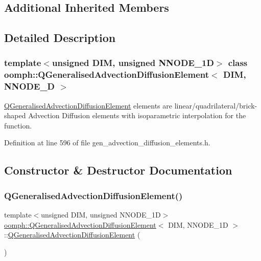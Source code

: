 \subsection*{Additional Inherited Members}


\subsection{Detailed Description}
\subsubsection*{template$<$unsigned D\+IM, unsigned N\+N\+O\+D\+E\+\_\+1D$>$\newline
class oomph\+::\+Q\+Generalised\+Advection\+Diffusion\+Element$<$ D\+I\+M, N\+N\+O\+D\+E\+\_\+D $>$}

\hyperlink{classoomph_1_1QGeneralisedAdvectionDiffusionElement}{Q\+Generalised\+Advection\+Diffusion\+Element} elements are linear/quadrilateral/brick-\/shaped Advection Diffusion elements with isoparametric interpolation for the function. 

Definition at line 596 of file gen\+\_\+advection\+\_\+diffusion\+\_\+elements.\+h.



\subsection{Constructor \& Destructor Documentation}
\mbox{\label{classoomph_1_1QGeneralisedAdvectionDiffusionElement_ac856e8a06e73d469496339fa6ce8f9dc}} 
\subsubsection{\texorpdfstring{Q\+Generalised\+Advection\+Diffusion\+Element()}{QGeneralisedAdvectionDiffusionElement()}\hspace{0.1cm}{\footnotesize\ttfamily [1/2]}}
{\footnotesize\ttfamily template$<$unsigned D\+IM, unsigned N\+N\+O\+D\+E\+\_\+1D$>$ \\
\hyperlink{classoomph_1_1QGeneralisedAdvectionDiffusionElement}{oomph\+::\+Q\+Generalised\+Advection\+Diffusion\+Element}$<$ D\+IM, N\+N\+O\+D\+E\+\_\+1D $>$\+::\hyperlink{classoomph_1_1QGeneralisedAdvectionDiffusionElement}{Q\+Generalised\+Advection\+Diffusion\+Element} (\begin{DoxyParamCaption}{ }\end{DoxyParamCaption})\hspace{0.3cm}{\ttfamily [inline]}}



